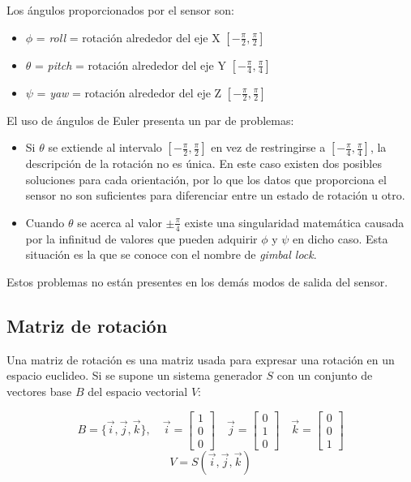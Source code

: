 \documentclass[10pt, a4paper]{report}
\begin{document}
Los ángulos proporcionados por el sensor son:

\begin{itemize}

\item $\phi$ = \textit{roll} = rotación alrededor del eje X $[-\frac{\pi}{2}, \frac{\pi}{2}]$

\item $\theta$ = \textit{pitch} = rotación alrededor del eje Y $[-\frac{\pi}{4}, \frac{\pi}{4}]$

\item $\psi$ = \textit{yaw} = rotación alrededor del eje Z $[-\frac{\pi}{2}, \frac{\pi}{2}]$

\end{itemize}

El uso de ángulos de Euler presenta un par de problemas:

\begin{itemize}

\item Si $\theta$ se extiende al intervalo $[-\frac{\pi}{2}, \frac{\pi}{2}]$ en vez de restringirse a $[-\frac{\pi}{4}, \frac{\pi}{4}]$, la descripción de la rotación no es única. En este caso existen dos posibles soluciones para cada orientación, por lo que los datos que proporciona el sensor no son suficientes para diferenciar entre un estado de rotación u otro.

\item Cuando $\theta$ se acerca al valor $\pm\frac{\pi}{4}$ existe una singularidad matemática causada por la infinitud de valores que pueden adquirir $\phi$ y $\psi$ en dicho caso. Esta situación es la que se conoce con el nombre de \textit{gimbal lock}.

\end{itemize}

Estos problemas no están presentes en los demás modos de salida del sensor.

\subsection{Matriz de rotación}

Una matriz de rotación es una matriz usada para expresar una rotación en un espacio euclideo. Si se supone un sistema generador $S$ con un conjunto de vectores base $B$ del espacio vectorial $V$:

$$ B = \{\vec{i}, \vec{j}, \vec{k}\}, \quad \vec{i} = \begin{bmatrix} 1\\0\\0 \end{bmatrix} \quad  \vec{j} = \begin{bmatrix} 0\\1\\0 \end{bmatrix} \quad  \vec{k} = \begin{bmatrix} 0\\0\\1 \end{bmatrix} $$
$$ V = S(\vec{i}, \vec{j}, \vec{k}) $$
\end{document}
